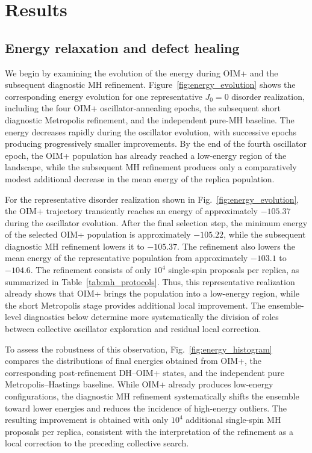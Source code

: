 \documentclass[
reprint,
amsmath,amssymb,
aps,
pre,
floatfix,
]{revtex4-2}
\begin{document}
\section{Results}
\label{sec:results}

\subsection{Energy relaxation and defect healing}

We begin by examining the evolution of the energy during OIM+ and the
subsequent diagnostic MH refinement. Figure~\ref{fig:energy_evolution}
shows the corresponding energy evolution for one representative $J_0=0$
disorder realization, including the four OIM+ oscillator-annealing epochs,
the subsequent short diagnostic Metropolis refinement, and the independent
pure-MH baseline. The energy decreases rapidly during the oscillator
evolution, with successive epochs producing progressively smaller
improvements. By the end of the fourth oscillator epoch, the OIM+
population has already reached a low-energy region of the landscape, while
the subsequent MH refinement produces only a comparatively modest
additional decrease in the mean energy of the replica population.


For the representative disorder realization shown in
Fig.~\ref{fig:energy_evolution}, the OIM+ trajectory transiently reaches
an energy of approximately $-105.37$ during the oscillator evolution.
After the final selection step, the minimum energy of the selected OIM+
population is approximately $-105.22$, while the subsequent diagnostic
MH refinement lowers it to $-105.37$. The refinement also lowers the mean
energy of the representative population from approximately $-103.1$ to
$-104.6$. The refinement consists of only $10^4$ single-spin proposals
per replica, as summarized in Table~\ref{tab:mh_protocols}. Thus, this
representative realization already shows that OIM+ brings the population
into a low-energy region, while the short Metropolis stage provides
additional local improvement. The ensemble-level diagnostics below
determine more systematically the division of roles between collective
oscillator exploration and residual local correction.


To assess the robustness of this observation, Fig.~\ref{fig:energy_histogram} compares the distributions of final energies obtained from OIM+, the corresponding post-refinement DH--OIM+ states, and the independent pure Metropolis--Hastings baseline. While OIM+ already produces low-energy configurations, the diagnostic MH refinement systematically shifts the ensemble toward lower energies and reduces the incidence of high-energy outliers. The resulting improvement is obtained with only \(10^4\) additional single-spin MH proposals per replica, consistent with the interpretation of the refinement as a local correction to the preceding collective search.
\end{document}
